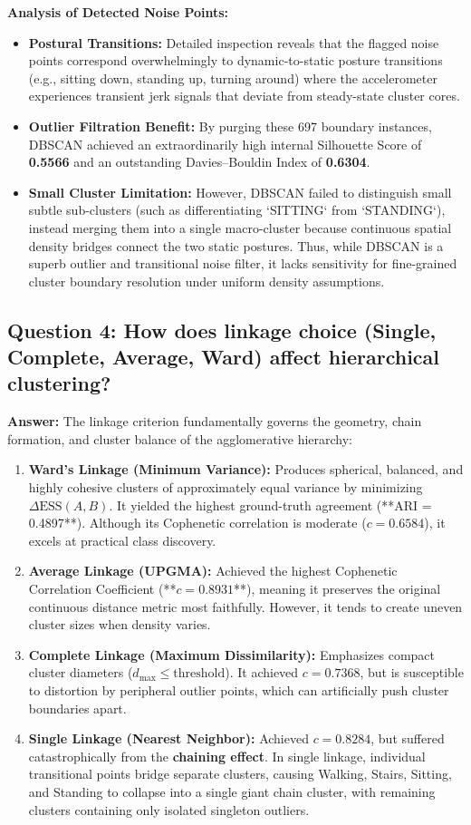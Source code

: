 \documentclass[12pt,a4paper]{article}
\begin{document}
\textbf{Analysis of Detected Noise Points:}
\begin{itemize}[noitemsep]
    \item \textbf{Postural Transitions:} Detailed inspection reveals that the flagged noise points correspond overwhelmingly to dynamic-to-static posture transitions (e.g., sitting down, standing up, turning around) where the accelerometer experiences transient jerk signals that deviate from steady-state cluster cores.
    \item \textbf{Outlier Filtration Benefit:} By purging these 697 boundary instances, DBSCAN achieved an extraordinarily high internal Silhouette Score of \textbf{0.5566} and an outstanding Davies--Bouldin Index of \textbf{0.6304}.
    \item \textbf{Small Cluster Limitation:} However, DBSCAN failed to distinguish small subtle sub-clusters (such as differentiating `SITTING` from `STANDING`), instead merging them into a single macro-cluster because continuous spatial density bridges connect the two static postures. Thus, while DBSCAN is a superb outlier and transitional noise filter, it lacks sensitivity for fine-grained cluster boundary resolution under uniform density assumptions.
\end{itemize}

\subsection{Question 4: How does linkage choice (Single, Complete, Average, Ward) affect hierarchical clustering?}
\textbf{Answer:}
The linkage criterion fundamentally governs the geometry, chain formation, and cluster balance of the agglomerative hierarchy:
\begin{enumerate}[noitemsep]
    \item \textbf{Ward's Linkage (Minimum Variance):} Produces spherical, balanced, and highly cohesive clusters of approximately equal variance by minimizing $\Delta \text{ESS}(A, B)$. It yielded the highest ground-truth agreement (**ARI = 0.4897**). Although its Cophenetic correlation is moderate ($c = 0.6584$), it excels at practical class discovery.
    \item \textbf{Average Linkage (UPGMA):} Achieved the highest Cophenetic Correlation Coefficient (**$c = 0.8931$**), meaning it preserves the original continuous distance metric most faithfully. However, it tends to create uneven cluster sizes when density varies.
    \item \textbf{Complete Linkage (Maximum Dissimilarity):} Emphasizes compact cluster diameters ($d_{\max} \le \text{threshold}$). It achieved $c = 0.7368$, but is susceptible to distortion by peripheral outlier points, which can artificially push cluster boundaries apart.
    \item \textbf{Single Linkage (Nearest Neighbor):} Achieved $c = 0.8284$, but suffered catastrophically from the \textbf{chaining effect}. In single linkage, individual transitional points bridge separate clusters, causing Walking, Stairs, Sitting, and Standing to collapse into a single giant chain cluster, with remaining clusters containing only isolated singleton outliers.
\end{enumerate}
\end{document}
